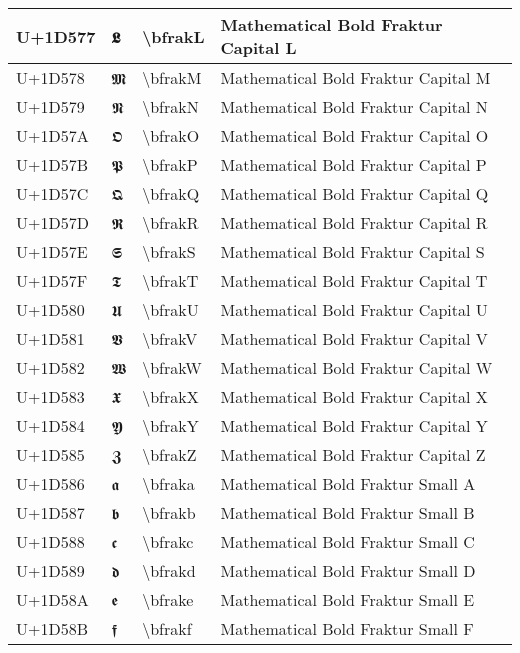 \begin{table}[h]
\begin{tabulary}{\linewidth}{|L|L|L|L|}
\hline
U+1D577 & 𝕷 & {\textbackslash}bfrakL & Mathematical Bold Fraktur Capital L \\
\hline
U+1D578 & 𝕸 & {\textbackslash}bfrakM & Mathematical Bold Fraktur Capital M \\
\hline
U+1D579 & 𝕹 & {\textbackslash}bfrakN & Mathematical Bold Fraktur Capital N \\
\hline
U+1D57A & 𝕺 & {\textbackslash}bfrakO & Mathematical Bold Fraktur Capital O \\
\hline
U+1D57B & 𝕻 & {\textbackslash}bfrakP & Mathematical Bold Fraktur Capital P \\
\hline
U+1D57C & 𝕼 & {\textbackslash}bfrakQ & Mathematical Bold Fraktur Capital Q \\
\hline
U+1D57D & 𝕽 & {\textbackslash}bfrakR & Mathematical Bold Fraktur Capital R \\
\hline
U+1D57E & 𝕾 & {\textbackslash}bfrakS & Mathematical Bold Fraktur Capital S \\
\hline
U+1D57F & 𝕿 & {\textbackslash}bfrakT & Mathematical Bold Fraktur Capital T \\
\hline
U+1D580 & 𝖀 & {\textbackslash}bfrakU & Mathematical Bold Fraktur Capital U \\
\hline
U+1D581 & 𝖁 & {\textbackslash}bfrakV & Mathematical Bold Fraktur Capital V \\
\hline
U+1D582 & 𝖂 & {\textbackslash}bfrakW & Mathematical Bold Fraktur Capital W \\
\hline
U+1D583 & 𝖃 & {\textbackslash}bfrakX & Mathematical Bold Fraktur Capital X \\
\hline
U+1D584 & 𝖄 & {\textbackslash}bfrakY & Mathematical Bold Fraktur Capital Y \\
\hline
U+1D585 & 𝖅 & {\textbackslash}bfrakZ & Mathematical Bold Fraktur Capital Z \\
\hline
U+1D586 & 𝖆 & {\textbackslash}bfraka & Mathematical Bold Fraktur Small A \\
\hline
U+1D587 & 𝖇 & {\textbackslash}bfrakb & Mathematical Bold Fraktur Small B \\
\hline
U+1D588 & 𝖈 & {\textbackslash}bfrakc & Mathematical Bold Fraktur Small C \\
\hline
U+1D589 & 𝖉 & {\textbackslash}bfrakd & Mathematical Bold Fraktur Small D \\
\hline
U+1D58A & 𝖊 & {\textbackslash}bfrake & Mathematical Bold Fraktur Small E \\
\hline
U+1D58B & 𝖋 & {\textbackslash}bfrakf & Mathematical Bold Fraktur Small F \\

\end{tabulary}
\end{table}
